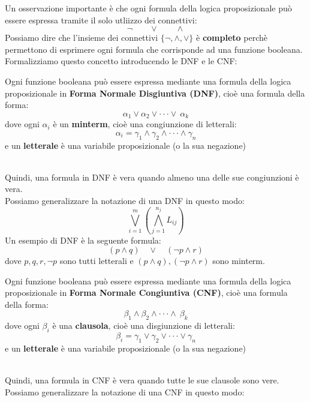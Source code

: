 Un osservazione importante è che ogni formula della logica proposizionale può essere espressa tramite il solo utliizzo dei connettivi:
\[   \neg \qquad \vee \qquad \wedge       \]
Possiamo dire che l'insieme dei connettivi $\{  \neg,\wedge, \vee   \}$ è \textbf{completo} perchè permettono di esprimere ogni formula che corrisponde ad una funzione booleana.
Formalizziamo questo concetto introducendo le DNF e le CNF: \smallskip\\
\colorbox{SALZO}{\parbox{\dimexpr\linewidth-2\fboxsep}{\begin{definition}
   Ogni funzione booleana può essere espressa mediante una formula della logica proposizionale in \textbf{Forma Normale Disgiuntiva (DNF)}, cioè una formula della forma:
   \[   \alpha_1 \vee \alpha_2 \vee \cdot\cdot\cdot \vee\  \alpha_k   \]
   dove ogni $\alpha_i$ è un \textbf{minterm}, cioè una congiunzione di letterali:
   \[    \alpha_i = \gamma_1 \wedge \gamma_2 \wedge \cdot \cdot \cdot \wedge \gamma_n  \]
   e un \textbf{letterale} è una variabile proposizionale (o la sua negazione)
\end{definition}}}\smallskip\\
Quindi, una formula in DNF è vera quando almeno una delle sue congiunzioni è vera. \\
Possiamo generalizzare la notazione di una DNF in questo modo:
\[\bigvee_{i = 1}^{m} \left(  \bigwedge_{j = 1}^{n_j} L_{ij}  \right)\]
Un esempio di DNF è la seguente formula:
\[     (p \wedge q) \quad \vee \quad (\neg p \wedge r)   \]
dove $p,q,r,\neg p$ sono tutti letterali e $(p \wedge q ), (\neg p \wedge r)$ sono minterm.\smallskip\\ \label{cnc}
\colorbox{SALZO}{\parbox{\dimexpr\linewidth-2\fboxsep}{\begin{definition}
   Ogni funzione booleana può essere espressa mediante una formula della logica proposizionale in \textbf{Forma Normale Congiuntiva (CNF)}, cioè una formula della forma:
   \[   \beta_1 \wedge \beta_2 \wedge \cdot\cdot\cdot \wedge\  \beta_k   \]
   dove ogni $\beta_i$ è una \textbf{clausola}, cioè una disgiunzione di letterali:
   \[    \beta_i = \gamma_1 \vee \gamma_2 \vee \cdot \cdot \cdot \vee \gamma_n  \]
   e un \textbf{letterale} è una variabile proposizionale (o la sua negazione)
\end{definition}}}\smallskip\\
Quindi, una formula in CNF è vera quando tutte le sue clausole sono vere.\\
Possiamo generalizzare la notazione di una CNF in questo modo:
